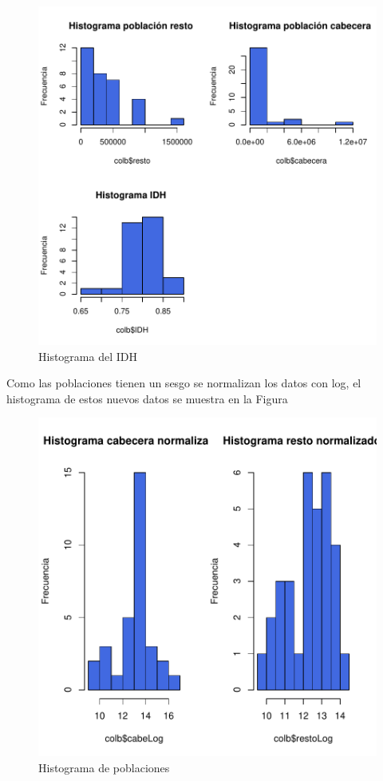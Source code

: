 \begin{figure}[h]
\centering
\includegraphics{Paper-histograma}
\caption{Histograma del IDH }
\label{histograma}
\end{figure}


Como las poblaciones tienen un sesgo se normalizan los datos con log, el histograma de estos nuevos datos se muestra en la Figura 

\begin{figure}[h]
\centering
\begin{adjustbox}{height=4cm}
\includegraphics{Paper-normal}
\end{adjustbox}
\caption{Histograma de poblaciones }
\label{normal}
\end{figure}


